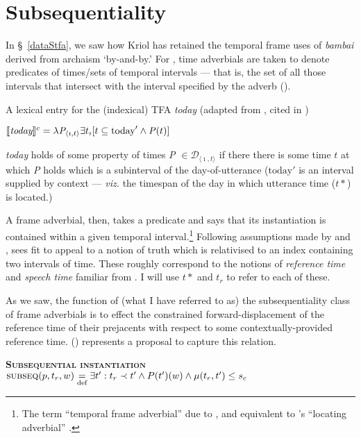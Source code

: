 	\section{Subsequentiality}\label{bambai.subseq}
	
	In §~\ref{dataStfa}, we saw how Kriol has retained the temporal frame uses of \textit{bambai} derived from archaism `by-and-by.' For \citet{Dowty1979,Dowty1982}, time adverbials are taken to denote predicates of times/sets of temporal intervals --- that is, the set of all those intervals that intersect with the interval specified by the adverb (\nextx).
	
	\pex A lexical entry for the (indexical) TFA \textit{today} (adapted from \citealt[328]{Dowty1979}, cited in \citealp[43]{Ogihara1996})
	
$ 	\denote[c]{\textit{today}}=\lambda \mathit P_{\langle\imath,t\rangle}\exists t_\imath[t\subseteq\text{today}'\wedge \mathit P(t)] $	

\textit{today} holds of some property of times \textit{P} $ \in\mathcal D_{\langle\imath,t\rangle} $ if there there is some time $ t $ at which \textit{P} holds which is a subinterval of the day-of-utterance ($ \mathrm{today}' $ is an interval supplied by context --- \textit{viz.} the timespan of the day in which utterance time ($ t* $) is located.)

	\xe
	
	 A frame adverbial, then, takes a predicate and says that its instantiation is contained within a given temporal interval.\footnote{The term ``temporal frame adverbial'' due to \citealp{Bennett}, and  equivalent to \citeauthor{Kamp1993}'s ``locating adverbial'' \citeyearpar[613]{Kamp1993}.} Following assumptions made by \citet[238\textit{ff}]{Kamp1971} and \citet[115]{Johnson1977}, \citet[29\textit{ff}]{Dowty1982} sees fit to appeal to a notion of truth which is relativised to an index containing two intervals of time. These roughly correspond to the notions of \textit{reference time} and \textit{speech time} familiar from \citet{Reichenbach1947}. I will use $ t* $ and $ t_r $ to refer to each of these.
	
	
	 As we saw, the function of (what I have referred to as) the {\sc subsequentiality} class of frame adverbials is to effect the constrained forward-displacement of the reference time of their prejacents with respect to some contextually-provided reference time. () represents a proposal to capture this relation.
	
	
	\pex {}\textbf{\textsc{Subsequential instantiation}} \\$\text{{\sc subseq}}(p,t_r,w)\underset{\text{def}}=\exists t^\prime:t_r\prec t'\wedge P(t^\prime)(w)\wedge\mu(t_r,t^\prime)\leq s_c$
	
